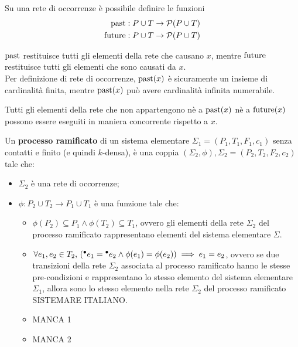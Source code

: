 Su una rete di occorrenze è possibile definire le funzioni
\begin{align*}
    \textnormal{past}: P \cup T &\rightarrow \mathcal{P}(P \cup T)\\
    \textnormal{future}: P \cup T &\rightarrow \mathcal{P}(P \cup T)
\end{align*}

$\textnormal{past}$ restituisce tutti gli elementi della rete che causano $x$, mentre
$\textnormal{future}$ restituisce tutti gli elementi che sono causati da $x$.\\
Per definizione di rete di occorrenze, $\textnormal{past}(x)$ è sicuramente un insieme
di cardinalità finita, mentre $\textnormal{past}(x)$ può avere cardinalità infinita
numerabile.

\begin{rem}
    Tutti gli elementi della rete che non appartengono nè a $\textnormal{past}(x)$ nè
    a $\textnormal{future}(x)$ possono essere eseguiti in maniera concorrente rispetto
    a $x$.
\end{rem}

\begin{defn}
    Un \textbf{processo ramificato} di un sistema elementare
    $\Sigma_1 = (P_1, T_1, F_1, c_1)$ senza contatti e finito (e quindi $k$-densa),
    è una coppia $(\Sigma_2, \phi), \Sigma_2 = (P_2, T_2, F_2, c_2)$ tale che:
    \begin{itemize}
        \item $\Sigma_2$ è una rete di occorrenze;
        \item $\phi: P_2 \cup T_2 \rightarrow P_1 \cup T_1$ è una funzione
        tale che:
        \begin{itemize}
            \item $\phi(P_2) \subseteq P_1 \land \phi(T_2) \subseteq T_1$,
            ovvero gli elementi della rete $\Sigma_2$ del processo ramificato
            rappresentano elementi del sistema elementare $\Sigma$.
            \item $\forall e_1, e_2 \in T_2, \, ({^\bullet}e_1 = {^\bullet}e_2
            \land \phi(e_1) = \phi(e_2)) \implies e_1 = e_2$, ovvero
            se due transizioni della rete $\Sigma_2$ associata al processo
            ramificato hanno le stesse pre-condizioni e rappresentano lo
            stesso elemento del sistema elementare $\Sigma_1$, allora sono
            lo stesso elemento nella rete $\Sigma_2$ del processo ramificato
            SISTEMARE ITALIANO.
            \item MANCA 1
            \item MANCA 2
        \end{itemize}
    \end{itemize}
\end{defn}

